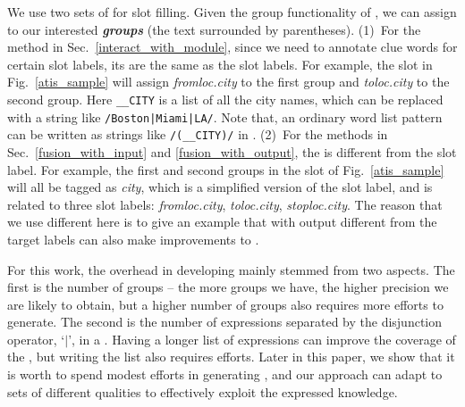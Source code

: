  We use two sets of \REs for slot filling. Given the group functionality of \RE, we can assign \REtags to our
interested \textbf{\emph{\RE groups}} (the text surrounded by parentheses). (1)~For the method in Sec.~\ref{interact_with_module}, since we
need to annotate clue words for certain slot labels, its \REtags are the same as the slot labels. For example, the slot \RE in
Fig.~\ref{atis_sample} will assign \emph{fromloc.city} to the first \RE group and \emph{toloc.city} to the second group. Here
\texttt{\_\_CITY} is a list of all the city names, which can be replaced with a string like \texttt{/Boston|Miami|LA/}. Note that, an
ordinary word list pattern can be written as strings like \texttt{/(\_\_CITY)/} in \RE. (2)~For the methods in Sec.~\ref{fusion_with_input}
and \ref{fusion_with_output}, the \REtag is different from the slot label. For example, the first and second \RE groups in the slot \RE of
Fig.~\ref{atis_sample} will all be tagged as \emph{city}, which is a simplified version of the slot label, and is related to three slot
labels: \emph{fromloc.city}, \emph{toloc.city}, \emph{stoploc.city}. The reason that we use different \REs here is to give an example that
\REs with output different from the target labels can also make improvements to \NN.



 For this work, the overhead in developing \REs mainly stemmed from two aspects. The first is the number of \RE
groups -- the more \RE groups we have, the higher precision we are likely to obtain, but a higher number of \RE groups also requires more
efforts to generate. The second is the number of expressions separated by the disjunction operator, `$|$', in a \RE. Having a
longer list of expressions can improve the coverage of the \RE, but writing the list also requires efforts. Later in this paper, we show
that it is worth to spend modest efforts in generating \REs, and our approach can adapt to \RE sets of different qualities to effectively
exploit the expressed knowledge.


